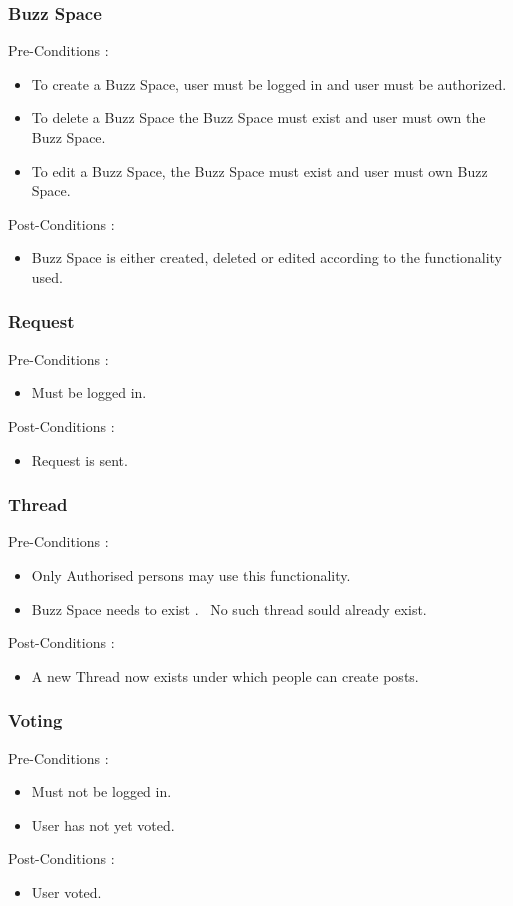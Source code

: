 \documentclass[12pt, oneside]{article}
\begin{document}
			\subsubsection{Buzz Space}
				Pre-Conditions : \begin{itemize}
							\item To create a Buzz Space, user must be logged in and user must be authorized.
							\item To delete a Buzz Space the Buzz Space must exist and user must own the Buzz Space.
							\item To edit a Buzz Space, the Buzz Space must exist and user must own Buzz Space.
						     \end{itemize}
				Post-Conditions : \begin{itemize}
							\item Buzz Space is either created, deleted or edited according to the functionality used.
						     \end{itemize}
			\subsubsection{Request}
				Pre-Conditions : \begin{itemize}
							\item Must be logged in.
						     \end{itemize}
				Post-Conditions : \begin{itemize}
							\item Request is sent.
						     \end{itemize}
			\subsubsection{Thread}
				Pre-Conditions : \begin{itemize}
							\item Only Authorised persons may use this functionality.
							\item Buzz Space needs to exist .
							\ No such thread sould already exist.
						     \end{itemize}
				Post-Conditions : \begin{itemize}
							\item A new Thread now exists under which people can create posts.
						     \end{itemize}
			\subsubsection{Voting}
				Pre-Conditions : \begin{itemize}
							\item Must not be logged in.
							\item User has not yet voted.
						     \end{itemize}
				Post-Conditions : \begin{itemize}
							\item User voted.
						     \end{itemize}
\end{document}
